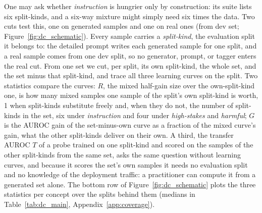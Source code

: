 \documentclass{article} %
\newcommand{\hs}{\emph{high-stakes}}
\newcommand{\harm}{\emph{harmful}}
\newcommand{\instr}{\emph{instruction}}
\begin{document}
One may ask whether \instr{} is hungrier only by construction: its suite lists six split-kinds, and a six-way mixture might simply need six times the data. Two cuts test this, one on generated samples and one on real ones (from dev set; Figure~\ref{fig:dc_schematic}). Every sample carries a \emph{split-kind}, the evaluation split it belongs to: the detailed prompt writes each generated sample for one split, and a real sample comes from one dev split, so no generator, prompt, or tagger enters the real cut. From one set we cut, per split, its own split-kind, the whole set, and the set minus that split-kind, and trace all three learning curves on the split. Two statistics compare the curves: $R$, the mixed half-gain size over the own-split-kind one, is how many mixed samples one sample of the split's own split-kind is worth, 1 when split-kinds substitute freely and, when they do not, the number of split-kinds in the set, six under \instr{} and four under \hs{} and \harm{}; $G$ is the AUROC gain of the set-minus-own curve as a fraction of the mixed curve's gain, what the other split-kinds deliver on their own. A third, the transfer AUROC $T$ of a probe trained on one split-kind and scored on the samples of the other split-kinds from the same set, asks the same question without learning curves, and because it scores the set's own samples it needs no evaluation split and no knowledge of the deployment traffic: a practitioner can compute it from a generated set alone. The bottom row of Figure~\ref{fig:dc_schematic} plots the three statistics per concept over the splits behind them (medians in Table~\ref{tab:dc_main}, Appendix~\ref{app:coverage}).
\end{document}
